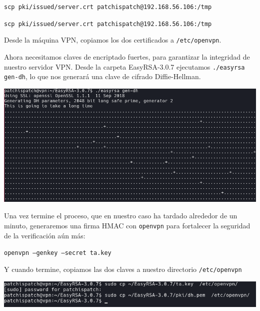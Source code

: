 \documentclass[11pt,a4paper]{article}
\begin{document}
\medskip

\texttt{scp pki/issued/server.crt patchispatch@192.168.56.106:/tmp}

\texttt{scp pki/issued/server.crt patchispatch@192.168.56.106:/tmp}

\medskip

Desde la máquina VPN, copiamos los dos certificados a \texttt{/etc/openvpn}.

\medskip

Ahora necesitamos claves de encriptado fuertes, para garantizar la integridad de nuestro servidor VPN. Desde la carpeta EasyRSA-3.0.7 ejecutamos \texttt{./easyrsa gen-dh}, lo que nos generará una clave de cifrado Diffie-Hellman.

\medskip

\begin{center}
\includegraphics[scale=0.4]{gen-dh.png}
\end{center}

\medskip

Una vez termine el proceso, que en nuestro caso ha tardado alrededor de un minuto, generaremos una firma HMAC con \texttt{openvpn} para fortalecer la seguridad de la verificación aún más:

\medskip

\texttt{openvpn --genkey --secret ta.key}

\medskip

Y cuando termine, copiamos las dos claves a nuestro directorio \texttt{/etc/openvpn}

\medskip

\begin{center}
\includegraphics[scale=0.4]{cp-ta-key.png}
\end{center}
\end{document}
